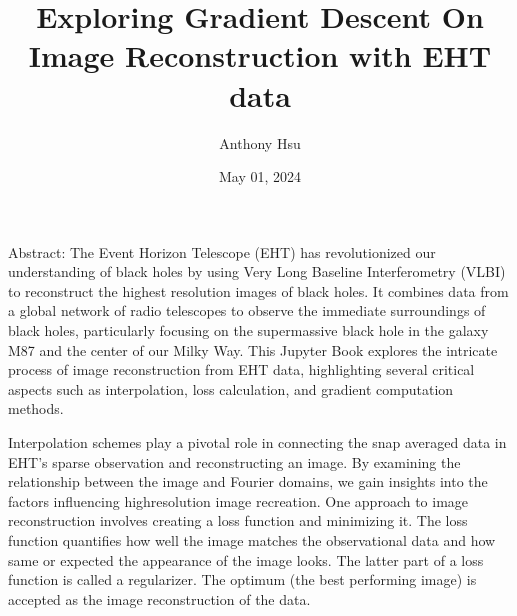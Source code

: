 \documentclass[letterpaper,10pt,english]{jupyterBook}
\title{Exploring Gradient Descent On Image Reconstruction with EHT data}
\date{May 01, 2024}
\author{Anthony Hsu}
\begin{document}
\pagestyle{empty}
\sphinxmaketitle
\pagestyle{plain}
\sphinxtableofcontents
\pagestyle{normal}
\label{\detokenize{intro::doc}}


\begin{DUlineblock}{0em}
\item[] 
\end{DUlineblock}

\sphinxAtStartPar
Abstract:
The Event Horizon Telescope (EHT) has revolutionized our understanding of black holes by using Very Long Baseline Interferometry (VLBI) to reconstruct the highest resolution images of black holes. It combines data from a global network of radio telescopes to observe the immediate surroundings of black holes, particularly focusing on the supermassive black hole in the galaxy M87 and the center of our Milky Way. This Jupyter Book explores the intricate process of image reconstruction from EHT data, highlighting several critical aspects such as interpolation, loss calculation, and gradient computation methods.

\sphinxAtStartPar
Interpolation schemes play a pivotal role in connecting the snap averaged data in EHT’s sparse observation and reconstructing an image. By examining the relationship between the image and Fourier domains, we gain insights into the factors influencing high\sphinxhyphen{}resolution image recreation. One approach to image reconstruction involves creating a loss function and minimizing it. The loss function quantifies how well the image matches the observational data and how same or expected the appearance of the image looks. The latter part of a loss function is called a regularizer. The optimum (the best performing image) is accepted as the image reconstruction of the data.
\end{document}
